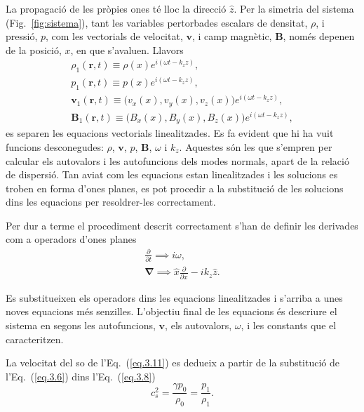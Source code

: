 \documentclass[12pt,a4paper]{article}
\numberwithin{equation}{section}
\begin{document}
La propagació de les pròpies ones té lloc la direcció $\hat{z}$.
Per la simetria del sistema (Fig.~\ref{fig:sistema}), tant les variables pertorbades escalars de densitat, $\rho$, i pressió, $p$, com les vectorials de velocitat, $\bm{v}$, i
camp magnètic, $\bm{B}$, només depenen de la posició, $x$, en que s'avaluen. Llavors
\begin{gather}
    \rho_1(\bm{r}, t) \equiv \rho(x) e^{i(\omega t - k_z z)}, \tag{3.14} \label{3.14} \\
    p_1(\bm{r}, t) \equiv p(x) e^{i(\omega t - k_z z)}, \tag{3.15} \label{3.15} \\
    \bm{v}_1(\bm{r}, t) \equiv \big(v_{x}(x), v_{y}(x), v_{z}(x)\big) e^{i(\omega t - k_z z)}, \tag{3.16} \label{3.16} \\
    \bm{B}_1(\bm{r}, t) \equiv \big(B_{x}(x), B_{y}(x), B_{z}(x)\big) e^{i(\omega t - k_z z)}, \tag{3.17} \label{3.17}
\end{gather}
es separen les equacions vectorials linealitzades. Es fa evident que hi ha vuit funcions desconegudes: $\rho$, $\bm{v}$, $p$, $\bm{B}$, $\omega$ i $k_z$.
Aquestes són les que s'empren per calcular els autovalors i les autofuncions dels modes normals, apart de la relació de dispersió.
Tan aviat com les equacions estan linealitzades i les solucions es troben en forma d'ones planes, es pot procedir a la substitució de les solucions
dins les equacions per resoldrer-les correctament.

\clearpage

Per dur a terme el procediment descrit correctament s'han de definir les derivades com a operadors d'ones planes
\begin{gather}
    \frac{\partial}{\partial t} \implies i \omega, \tag{3.18} \label{eq.3.18} \\
    \bm{\nabla} \implies \hat{x} \frac{\partial}{\partial x} - i k_z \hat{z}. \tag{3.19} \label{eq.3.19}
\end{gather}

Es substitueixen els operadors dins les equacions linealitzades i s'arriba a unes noves equacions més senzilles.
L'objectiu final de les equacions és descriure el sistema en segons les autofuncions, $\bm{v}$, els autovalors, $\omega$, i les constants que el caracteritzen.

La velocitat del so de l'Eq.~(\ref{eq.3.11}) es dedueix a partir de la substitució de l'Eq.~(\ref{eq.3.6}) dins l'Eq.~(\ref{eq.3.8})
\begin{equation}
    c_s^2 = \frac{\gamma p_0}{\rho_0} =  \frac{p_1}{\rho_1}. \tag{3.20} \label{eq.3.20}
\end{equation}
\end{document}
